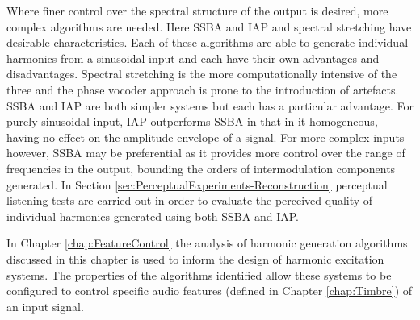 	Where finer control over the spectral structure of the output is desired, more complex algorithms are needed. Here
	SSBA and IAP and spectral stretching have desirable characteristics. Each of these algorithms are able to generate
	individual harmonics from a sinusoidal input and each have their own advantages and disadvantages. Spectral
	stretching is the more computationally intensive of the three and the phase vocoder approach is prone to the
	introduction of artefacts. SSBA and IAP are both simpler systems but each has a particular advantage. For purely
	sinusoidal input, IAP outperforms SSBA in that in it homogeneous, having no effect on the amplitude envelope of a
	signal. For more complex inputs however, SSBA may be preferential as it provides more control over the range of
	frequencies in the output, bounding the orders of intermodulation components generated.	In Section
	\ref{sec:PerceptualExperiments-Reconstruction} perceptual listening tests are carried out in order to evaluate the
	perceived quality of individual harmonics generated using both SSBA and IAP.

	In Chapter \ref{chap:FeatureControl} the analysis of harmonic generation algorithms discussed in this chapter is
	used to inform the design of harmonic excitation systems. The properties of the algorithms identified allow these
	systems to be configured to control specific audio features (defined in Chapter \ref{chap:Timbre}) of an input
	signal.
